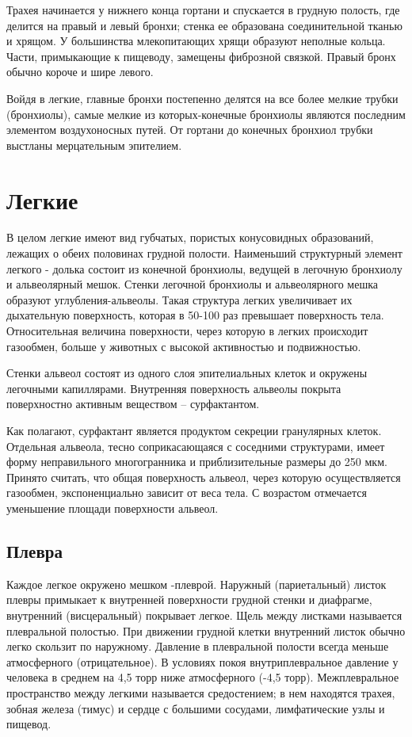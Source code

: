 \documentclass[a4paper,14pt]{extreport}
\begin{document}
Трахея начинается у нижнего конца гортани и спускается в грудную полость, где делится на правый и левый бронхи; стенка ее образована соединительной тканью и хрящом. У большинства млекопитающих хрящи образуют неполные кольца. Части, примыкающие  к пищеводу,  замещены  фиброзной связкой. Правый бронх обычно короче и шире левого. 

Войдя в легкие, главные бронхи постепенно делятся на все более мелкие трубки (бронхиолы), самые мелкие из которых-конечные бронхиолы  являются  последним  элементом  воздухоносных путей. От гортани до конечных бронхиол трубки выстланы мерцательным эпителием.


\section{Легкие}
В целом легкие имеют вид губчатых, пористых конусовидных образований, лежащих о обеих половинах грудной полости.
Наименьший структурный элемент легкого - долька состоит из конечной бронхиолы, ведущей в легочную бронхиолу и альвеолярный мешок. Стенки легочной бронхиолы и альвеолярного мешка образуют углубления-альвеолы.  Такая  структура  легких  увеличивает  их  дыхательную  поверхность, которая  в  50-100  раз  превышает  поверхность  тела.    Относительная  величина  поверхности,  через  которую  в  легких  происходит  газообмен,  больше  у  животных  с  высокой  активностью  и  подвижностью.

Стенки альвеол состоят из одного слоя эпителиальных клеток и окружены легочными  капиллярами.  Внутренняя  поверхность альвеолы покрыта поверхностно активным  веществом  -- сурфактантом. 

Как полагают, сурфактант является продуктом секреции гранулярных клеток.  Отдельная альвеола, тесно соприкасающаяся с  соседними  структурами,  имеет форму неправильного многогранника и приблизительные размеры до 250 мкм. Принято считать, что общая поверхность альвеол,  через которую осуществляется газообмен, экспоненциально  зависит от веса тела. С возрастом отмечается уменьшение площади поверхности альвеол.

\subsection{Плевра}
Каждое легкое окружено мешком  -плеврой. Наружный  (париетальный) листок плевры примыкает к внутренней поверхности грудной стенки и диафрагме, внутренний (висцеральный) покрывает легкое. Щель между листками называется плевральной полостью. При движении грудной клетки внутренний листок обычно легко скользит по наружному. Давление в плевральной полости всегда меньше атмосферного (отрицательное). В условиях покоя внутриплевральное давление у человека в среднем на 4,5 торр ниже атмосферного (-4,5 торр). Межплевральное пространство между легкими называется средостением; в нем находятся трахея,  зобная железа (тимус) и сердце с большими сосудами, лимфатические узлы и пищевод.
\end{document}
